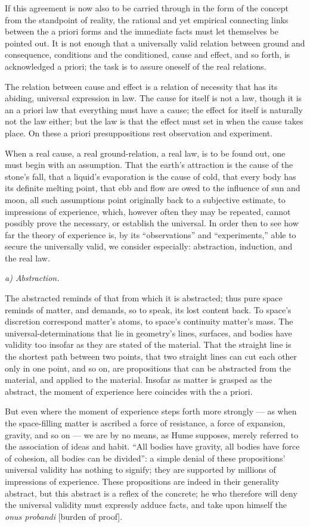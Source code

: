 \documentclass[12pt]{book}
\begin{document}
If this agreement is now also to be carried through in the form of the concept from
the standpoint of reality, the rational and yet empirical connecting links between
the a priori forms and the immediate facts must let themselves be pointed out. It
is not enough that a universally valid relation between ground and consequence,
conditions and the conditioned, cause and effect, and so forth, is acknowledged a
priori; the task is to assure oneself of the real relations.

The relation between cause and effect is a relation of necessity that has its
abiding, universal expression in law. The cause for itself is not a law, though it
is an a priori law that everything must have a cause; the effect for itself is
naturally not the law either; but the law is that the effect must set in when the
cause takes place. On these a priori presuppositions rest observation and
experiment.

When a real cause, a real ground-relation, a real law, is to be found out, one must
begin with an assumption. That the earth's attraction is the cause of the stone's
fall, that a liquid's evaporation is the cause of cold, that every body has its
definite melting point, that ebb and flow are owed to the influence of sun and
moon, all such assumptions point originally back to a subjective estimate, to
impressions of experience, which, however often they may be repeated, cannot
possibly prove the necessary, or establish the universal.
In order then to see how far the theory of experience is, by its ``observations''
and ``experiments,'' able to secure the universally valid, we consider especially:
abstraction, induction, and the real law.

\emph{a) Abstraction.}

The abstracted reminds of that from which it is abstracted; thus pure space reminds
of matter, and demands, so to speak, its lost content back. To space's discretion
correspond matter's atoms, to space's continuity matter's mass. The
universal-determinations that lie in geometry's lines, surfaces, and bodies have
validity too insofar as they are stated of the material. That the straight line is
the shortest path between two points, that two straight lines can cut each other
only in one point, and so on, are propositions that can be abstracted from the
material, and applied to the material. Insofar as matter is grasped as the
abstract, the moment of experience here coincides with the a priori.

But even where the moment of experience steps forth more strongly — as when the
space-filling matter is ascribed a force of resistance, a force of expansion,
gravity, and so on — we are by no means, as Hume supposes, merely referred to the
association of ideas and habit. ``All bodies have gravity, all bodies have force of
cohesion, all bodies can be divided'': a simple denial of these propositions'
universal validity has nothing to signify; they are supported by millions of
impressions of experience. These propositions are indeed in their generality
abstract, but this abstract is a reflex of the concrete; he who therefore will deny
the universal validity must expressly adduce facts, and take upon himself the
\textit{onus probandi} [burden of proof].
\end{document}
